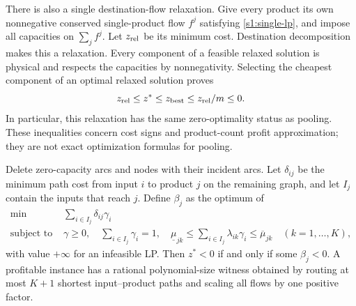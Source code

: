 There is also a single destination-flow relaxation. Give every product
its own nonnegative conserved single-product flow $f^j$ satisfying
\eqref{s1:single-lp}, and impose all capacities on $\sum_j f^j$.
Let $z_{\rm rel}$ be its minimum cost. Destination decomposition makes
this a relaxation. Every component of a feasible relaxed solution is
physical and respects the capacities by nonnegativity. Selecting the
cheapest component of an optimal relaxed solution proves
\[
 z_{\rm rel}\le z^*\le z_{\rm best}\le z_{\rm rel}/m\le0.
\]
In particular, this relaxation has the same zero-optimality status as
pooling. These inequalities concern cost signs and product-count profit
approximation; they are not exact optimization formulas for pooling.

\begin{theorem}\label{s1:paths}
Delete zero-capacity arcs and nodes with their incident arcs. Let
$\delta_{ij}$ be the minimum path cost from input $i$ to product $j$
on the remaining graph, and let $I_j$ contain the inputs that reach $j$.
Define $\beta_j$ as the optimum of
\begin{align*}
 \min\ &\sum_{i\in I_j}\delta_{ij}\gamma_i\\
 \text{subject to }&\gamma\ge0,\quad\sum_{i\in I_j}\gamma_i=1,\quad
 \underline\mu_{jk}\le\sum_{i\in I_j}\lambda_{ik}\gamma_i
                                  \le\overline\mu_{jk}\quad(k=1,\ldots,K),
\end{align*}
with value $+\infty$ for an infeasible LP. Then $z^*<0$ if and only if
some $\beta_j<0$. A profitable instance has a rational polynomial-size
witness obtained by routing at most $K+1$ shortest input--product paths
and scaling all flows by one positive factor.
\end{theorem}

